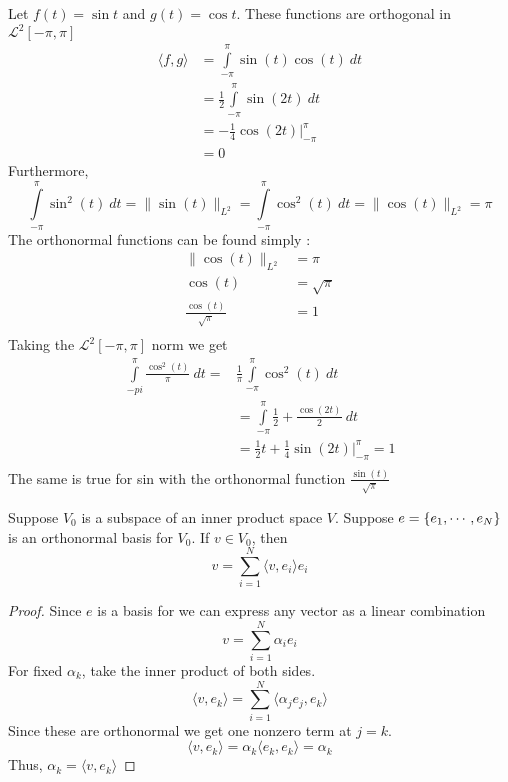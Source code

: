 \begin{exmp}[]
    Let $ f(t) = \sin t  $ and $ g(t) = \cos t $. These functions are orthogonal in $
    \mathscr{L}^2[-\pi,\pi] $ 
    \begin{align*}
        \langle f , g \rangle  &= \int\limits_{-\pi}^{\pi} \sin(t)\cos(t) \ dt \\
                               &= \frac{ 1 }{ 2 } \int\limits_{-\pi}^{\pi} \sin(2t) \ dt
                            \\ 
                               &= -\frac{ 1 }{ 4 }\cos(2t) \Big|_{-\pi}^\pi   \\
                                &= 0
    \end{align*}
    Furthermore, 
    \[
        \int\limits_{-\pi}^{\pi} \sin^2(t) \ dt = \|\sin(t)\|_{L^2} =
        \int\limits_{-\pi}^{\pi} \cos^2(t) \ dt = \|\cos(t)\|_{L^2 } = \pi
    \]
   The orthonormal functions can be found simply : 
   \begin{align*}
       \|\cos(t) \|_{L^2 } &= \pi \\
       \cos(t)  &= \sqrt{\pi} \\ 
       \frac{ \cos(t) }{ \sqrt{\pi} }  &= 1 \\ 
   \end{align*}
   Taking the $ \mathscr{L}^2[-\pi,\pi] $ norm we get 
   \begin{align*}
       \int\limits_{-pi}^{\pi} \frac{ \cos^2(t) }{ \pi } \ dt =& \frac{ 1 }{ \pi }
       \int\limits_{-\pi}^{\pi} \cos^2(t) \ dt \\ 
       &= \int\limits_{-\pi}^{\pi} \frac{ 1 }{ 2 } + \frac{\cos(2t) }{ 2 } \ dt  \\ 
       &= \frac{ 1 }{ 2 } t  + \frac{ 1 }{ 4 } \sin(2t) \Big|_{-\pi}^\pi = 1  \\ 
   \end{align*}
   The same is true for sin with the orthonormal function $ \frac{ \sin(t) }{ \sqrt{\pi} }  $ 
\end{exmp}












\begin{ftheo}[]
    Suppose $ V_0 $ is a subspace of an inner product space $ V $. Suppose $e =  \set{ e_1,
    \cdots, e_N }  $ is an orthonormal basis for $ V_0 $. If $ v \in V_0 $, then 
    \[
    v = \sum_{i=1}^{N} \langle v  , e_i \rangle e_i
    \]
    \label{th:}
\end{ftheo}
\begin{proof}
    Since $ e $ is a basis for we can express any vector as a linear combination 
    \[
        v = \sum_{i=1}^{N} \alpha_ie_i
    \]
    For fixed $ \alpha_k $, take the inner product of both sides. 
    \[
    \langle v  , e_k \rangle = \sum_{i=1}^{N} \langle \alpha_je_j , e_k \rangle 
    \]
    Since these are orthonormal we get one nonzero term at $ j = k $. 
    \[
    \langle v  , e_k \rangle = \alpha_k \langle e_k , e_k \rangle = \alpha_k
    \]
    Thus, $ \alpha_k = \langle v  , e_k \rangle  $
\end{proof}
